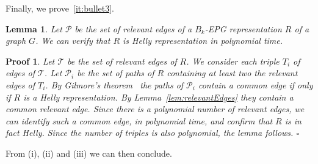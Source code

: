 \documentclass[9pt]{entcs}
\newtheorem{lema}{Lemma}[section]
\newtheorem{prove}{Proof}[section]
\begin{document}


 

Finally, we prove~\ref{it:bullet3}.


\begin{lema}
Let $\mathcal{P}$ be the set of relevant edges of a $B_k$-EPG representation $R$ of a graph $G$. We can verify that $R$ is Helly representation in polynomial time.
\end{lema}
\setcounter{prove}{2}

\begin{prove}
Let $\mathcal{T}$ be the set of relevant edges of $R$. We consider each triple $T_i$ of edges of $\mathcal{T}$. Let $\mathcal{P}_i$ be the set of paths of $R$ containing at least two the relevant edges of $T_i$. By Gilmore's theorem~\cite{bergeDuchet1975} the paths of $\mathcal{P}_i$  contain a common edge if only if  $R$ is a Helly representation.  By Lemma~\ref{lem:relevantEdges} they contain a common relevant edge. Since there is a polynomial number of relevant edges, we can identify such a common edge, in polynomial time, and confirm that $R$ is in fact Helly. Since the number of triples is also polynomial, the lemma follows.
$\square$ \end{prove}

From (i), (ii) and (iii) we can then conclude.
\end{document}
